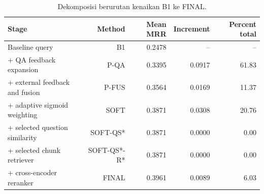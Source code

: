 \begin{table}[t]
\centering
\small
\caption{Dekomposisi berurutan kenaikan B1 ke FINAL.}
\label{tab:decomposition}
\begin{tabular}{lrrrr}
\toprule
Stage & Method & Mean MRR & Increment & Percent total \\
\midrule
Baseline query & B1 & 0.2478 & -- & -- \\
+ QA feedback expansion & P-QA & 0.3395 & 0.0917 & 61.83 \\
+ external feedback and fusion & P-FUS & 0.3564 & 0.0169 & 11.37 \\
+ adaptive sigmoid weighting & SOFT & 0.3871 & 0.0308 & 20.76 \\
+ selected question similarity & SOFT-QS* & 0.3871 & 0.0000 & 0.00 \\
+ selected chunk retriever & SOFT-QS*-R* & 0.3871 & 0.0000 & 0.00 \\
+ cross-encoder reranker & FINAL & 0.3961 & 0.0089 & 6.03 \\
\bottomrule
\end{tabular}
\end{table}
